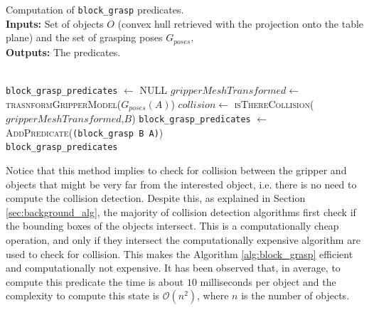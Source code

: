 \begin{algorithm}
\caption{Computation of \texttt{block\_grasp} predicates. \\
\textbf{Inputs:} Set of objects $O$ (convex hull retrieved with the projection onto the table plane) and  the set of grasping poses $G_{poses}$.\\
\textbf{Outputs:} The  predicates.
}\label{alg:block_grasp}
\begin{algorithmic}
\\
  \texttt{block\_grasp\_predicates} $\gets$ \textsc{NULL}
  \State $gripperMeshTransformed \gets$ \textsc{trasnformGripperModel}($G_{poses}(A)$)
	\State $collision \gets$ \textsc{isThereCollision($gripperMeshTransformed$,$B$)}
		\State \texttt{block\_grasp\_predicates} $\gets$ \textsc{AddPredicate}(\texttt{(block\_grasp B A)})
	\EndIf
  \EndIf
\EndFor
\EndFor \\
\Return  \texttt{block\_grasp\_predicates}
\EndFunction
\end{algorithmic}
\end{algorithm}   
 
Notice that this method implies to check for collision between the gripper and objects that might be very far from the interested object, i.e. there is no need to compute the collision detection.  Despite this, as explained in Section \ref{sec:background_alg}, the majority of collision detection algorithms first check if the bounding boxes of the objects intersect. This is a computationally cheap operation, and only if they intersect the computationally expensive algorithm are used to check for collision. This makes the Algorithm \ref{alg:block_grasp} efficient and computationally not expensive. It has been observed that, in average, to compute this predicate the time is about $10$ milliseconds per object and the complexity to compute this state is $\mathcal{O}(n^2)$, where $n$ is the number of objects.
 
